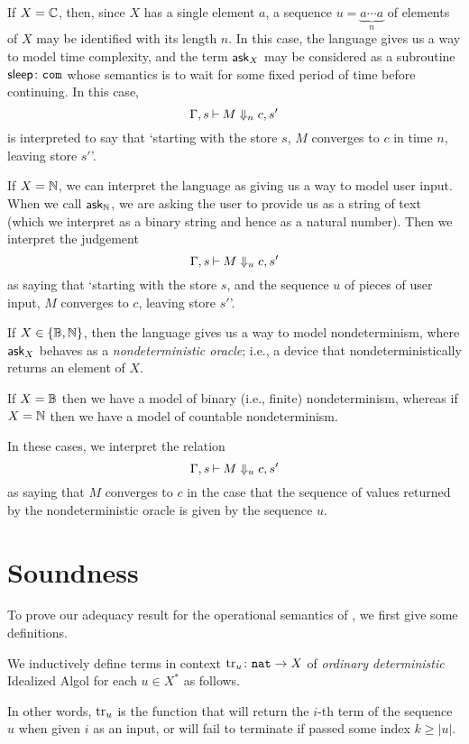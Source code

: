 \begin{example}
  If $X=\mathbb{C}$, then, since $X$ has a single element $a$, a sequence $u=\underbrace{a\cdots a}_n$ of elements of $X$ may be identified with its length $n$.
  In this case, the language \IAX gives us a way to model time complexity, and the term $\operatorname{{\mathsf{ask}}}_X$ may be considered as a subroutine ${\mathsf{sleep}}\colon {\mathtt{com}}$ whose semantics is to wait for some fixed period of time before continuing.  
  In this case, 
  \[
    \Gamma,s\mathbin{\vdash} M \Downarrow_n c,s'
    \]
  is interpreted to say that `starting with the store $s$, $M$ converges to $c$ in time $n$, leaving store $s'$'.
\end{example}
\begin{example}
  If $X=\mathbb{N}$, we can interpret the language \IAX as giving us a way to model user input.  
  When we call $\operatorname{{\mathsf{ask}}}_{\mathbb{N}}$, we are asking the user to provide us as a string of text (which we interpret as a binary string and hence as a natural number).  
  Then we interpret the judgement
  \[
    \Gamma,s\mathbin{\vdash} M \Downarrow_u c,s'
    \]
  as saying that `starting with the store $s$, and the sequence $u$ of pieces of user input, $M$ converges to $c$, leaving store $s'$'.
\end{example}
\begin{example}
  If $X\in\{\mathbb{B},\mathbb{N}\}$, then the language \IAX gives us a way to model nondeterminism, where $\operatorname{{\mathsf{ask}}}_X$ behaves as a \emph{nondeterministic oracle}; i.e., a device that nondeterministically returns an element of $X$.

  If $X=\mathbb{B}$ then we have a model of binary (i.e., finite) nondeterminism, whereas if $X=\mathbb{N}$ then we have a model of countable nondeterminism.

  In these cases, we interpret the relation
  \[
    \Gamma,s\mathbin{\vdash} M \Downarrow_u c,s'
    \]
  as saying that $M$ converges to $c$ in the case that the sequence of values returned by the nondeterministic oracle is given by the sequence $u$.
\end{example}

\section{Soundness}
\label{SecSoundness}

To prove our adequacy result for the operational semantics of \IAX, we first give some definitions.

\begin{definition}
  We inductively define terms in context $\operatorname{tr}_u\colon {\mathtt{nat}} \to X$ of \emph{ordinary deterministic} Idealized Algol for each $u\in X^*$ as follows.
\end{definition}
In other words, $\operatorname{tr}_u$ is the function that will return the $i$-th term of the sequence $u$ when given $i$ as an input, or will fail to terminate if passed some index $k\ge|u|$.

